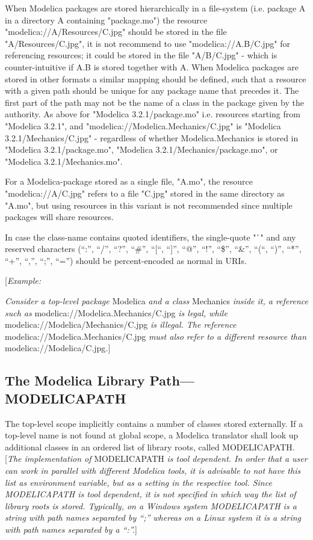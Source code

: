 When Modelica packages are stored hierarchically in a file-system (i.e.
package A in a directory A containing "package.mo") the resource
"modelica://A/Resources/C.jpg" should be stored in the file
"A/Resources/C.jpg", it is not recommend to use "modelica://A.B/C.jpg"
for referencing resources; it could be stored in the file "A/B/C.jpg" -
which is counter-intuitive if A.B is stored together with A. When
Modelica packages are stored in other formats a similar mapping should
be defined, such that a resource with a given path should be unique for
any package name that precedes it. The first part of the path may not be
the name of a class in the package given by the authority. As above for
"Modelica 3.2.1/package.mo" i.e. resources starting from "Modelica
3.2.1", and "modelica://Modelica.Mechanics/C.jpg" is "Modelica
3.2.1/Mechanics/C.jpg" - regardless of whether Modelica.Mechanics is
stored in "Modelica 3.2.1/package.mo", "Modelica
3.2.1/Mechanics/package.mo", or "Modelica 3.2.1/Mechanics.mo".

For a Modelica-package stored as a single file, "A.mo", the resource
"modelica://A/C.jpg" refers to a file "C.jpg" stored in the same
directory as "A.mo", but using resources in this variant is not
recommended since multiple packages will share resources.

In case the class-name contains quoted identifiers, the single-quote "`"
and any reserved characters (``:'', ``/'', ``?'', ``\#'', ``{[}``,
``{]}'', ``@'', ``!'', ``\$'', ``\&'', ``(``, ``)'', ``*'', ``+'',
``,'', ``;'', ``='') should be percent-encoded as normal in URIs.

{[}\emph{Example:}

\emph{Consider a top-level package} Modelica \emph{and a class}
Mechanics \emph{inside it, a reference such as}
modelica://Modelica.Mechanics/C.jpg \emph{is legal, while}
modelica://Modelica/Mechanics/C.jpg \emph{is illegal. The reference}
modelica://Modelica.Mechanics/C.jpg \emph{must also refer to a different
resource than} modelica://Modelica/C.jpg\emph{.}{]}

\subsection{The Modelica Library Path---MODELICAPATH}

The top-level scope implicitly contains a number of classes stored
externally. If a top-level name is not found at global scope, a Modelica
translator shall look up additional classes in an ordered list of
library roots, called MODELICAPATH. {[}\emph{The implementation of}
MODELICAPATH \emph{is tool dependent. In order that a user can work in
parallel with different Modelica tools, it is advisable to not have this
list as environment variable, but as a setting in the respective tool.
Since MODELICAPATH is tool dependent, it is not specified in which way
the list of library roots is stored. Typically, on a Windows system
MODELICAPATH is a string with path names separated by ``;'' whereas on a
Linux system it is a string with path names separated by a ``:''.}{]}

